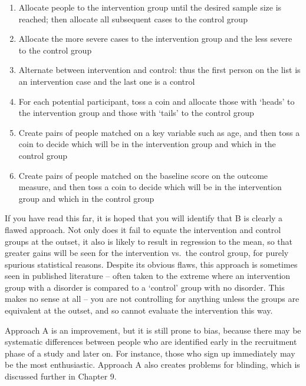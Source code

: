\documentclass[]{book}
\providecommand{\tightlist}{%
  \setlength{\itemsep}{0pt}\setlength{\parskip}{0pt}}
\begin{document}
\begin{enumerate}
\def\labelenumi{\Alph{enumi}.}
\tightlist
\item
  Allocate people to the intervention group until the desired sample size is reached; then allocate all subsequent cases to the control group
\item
  Allocate the more severe cases to the intervention group and the less severe to the control group
\item
  Alternate between intervention and control: thus the first person on the list is an intervention case and the last one is a control
\item
  For each potential participant, toss a coin and allocate those with `heads' to the intervention group and those with `tails' to the control group
\item
  Create pairs of people matched on a key variable such as age, and then toss a coin to decide which will be in the intervention group and which in the control group
\item
  Create pairs of people matched on the baseline score on the outcome measure, and then toss a coin to decide which will be in the intervention group and which in the control group
\end{enumerate}

If you have read this far, it is hoped that you will identify that B is clearly a flawed approach. Not only does it fail to equate the intervention and control groups at the outset, it also is likely to result in regression to the mean, so that greater gains will be seen for the intervention vs.~the control group, for purely spurious statistical reasons. Despite its obvious flaws, this approach is sometimes seen in published literature -- often taken to the extreme where an intervention group with a disorder is compared to a `control' group with no disorder. This makes no sense at all -- you are not controlling for anything unless the groups are equivalent at the outset, and so cannot evaluate the intervention this way.

Approach A is an improvement, but it is still prone to bias, because there may be systematic differences between people who are identified early in the recruitment phase of a study and later on. For instance, those who sign up immediately may be the most enthusiastic. Approach A also creates problems for blinding, which is discussed further in Chapter 9.
\end{document}
